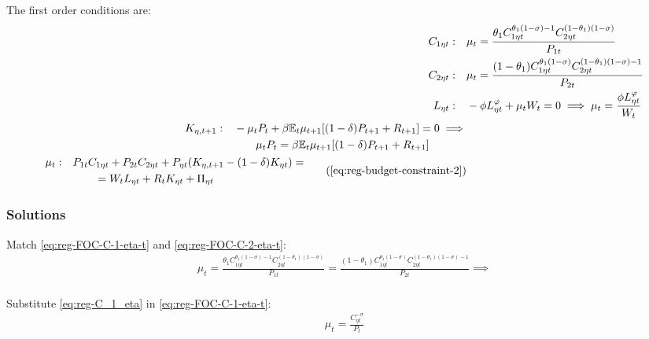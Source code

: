 \documentclass[
	thesis.tex
	]{subfiles}
\begin{document}
The first order conditions are:
\begin{align}
	C_{1\eta t}: \quad & \mu_t = \frac{\theta_1 C_{1\eta t}^{\theta_1 (1 -\sigma) -1} C_{2\eta t}^{(1 -\theta_1)(1 -\sigma)}}{P_{1t}} \label{eq:reg-FOC-C-1-eta-t} \\
	C_{2\eta t}: \quad & \mu_t = \frac{(1 -\theta_1) C_{1\eta t}^{\theta_1 (1 -\sigma)} C_{2\eta t}^{(1 -\theta_1)(1 -\sigma)-1}}{P_{2t}} \label{eq:reg-FOC-C-2-eta-t} \\
	L_{\eta t}: \quad & -\phi L_{\eta t}^{\varphi} +\mu_t W_t = 0 \implies \mu_t = \frac{\phi L_{\eta t}^{\varphi}}{W_t} \label{eq:reg-household-FOC-Lt} \\
	\begin{split}
		K_{\eta, t+1}: \quad & -\mu_t P_t +\beta \mathbb{E}_t \mu_{t+1} [(1-\delta) P_{t+1} + R_{t+1}] = 0 \implies \\ & \qquad \mu_t P_t = \beta \mathbb{E}_t \mu_{t+1} [(1-\delta) P_{t+1} + R_{t+1}]
	\end{split} \label{eq:reg-household-FOC-Kt} \\
	\begin{split}
		\mu_t: \quad & P_{1t} C_{1\eta t} + P_{2t} C_{2\eta t} + P_{\eta t} (K_{\eta, t+1} - (1-\delta)K_{\eta t}) = \\ & \qquad = W_t L_{\eta t} + R_t K_{\eta t} + \Pi_{\eta t}
	\end{split} \tag{\ref{eq:reg-budget-constraint-2}}
\end{align}

\subsubsection*{Solutions}

Match \ref{eq:reg-FOC-C-1-eta-t} and \ref{eq:reg-FOC-C-2-eta-t}:
\begin{align}
	\mu_t = \frac{\theta_1 C_{1\eta t}^{\theta_1 (1 -\sigma) -1} C_{2\eta t}^{(1 -\theta_1)(1 -\sigma)}}{P_{1t}} = \frac{(1 -\theta_1) C_{1\eta t}^{\theta_1 (1 -\sigma)} C_{2\eta t}^{(1 -\theta_1)(1 -\sigma)-1}}{P_{2t}} \implies \nonumber \\
\end{align}



Substitute \ref{eq:reg-C_1_eta} in \ref{eq:reg-FOC-C-1-eta-t}:
\begin{align}
	\mu_t = \frac{C_{\eta t}^{-\sigma}}{P_t} \label{eq:reg-household-FOC-Ct}
\end{align}
\end{document}
